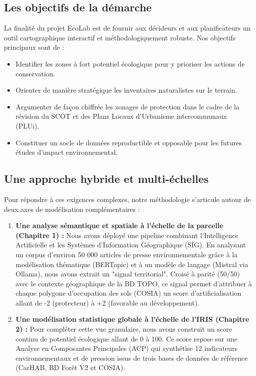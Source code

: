 \documentclass[11pt,a4paper]{report}
\begin{document}
\subsection*{Les objectifs de la démarche}

La finalité du projet EcoLab est de fournir aux décideurs et aux planificateurs un outil cartographique interactif et méthodologiquement robuste. Nos objectifs principaux sont de :

\begin{itemize}
    \item Identifier les zones à fort potentiel écologique pour y prioriser les actions de conservation.
    \item Orienter de manière stratégique les inventaires naturalistes sur le terrain.
    \item Argumenter de façon chiffrée les zonages de protection dans le cadre de la révision du SCOT et des Plans Locaux d'Urbanisme intercommunaux (PLUi).
    \item Constituer un socle de données reproductible et opposable pour les futures études d'impact environnemental.
\end{itemize}

\subsection*{Une approche hybride et multi-échelles}

Pour répondre à ces exigences complexes, notre méthodologie s'articule autour de deux axes de modélisation complémentaires :

\begin{enumerate}
    \item \textbf{Une analyse sémantique et spatiale à l'échelle de la parcelle (Chapitre 1) :} Nous avons déployé une pipeline combinant l'Intelligence Artificielle et les Systèmes d'Information Géographique (SIG). En analysant un corpus d'environ 50 000 articles de presse environnementale grâce à la modélisation thématique (BERTopic) et à un modèle de langage (Mistral via Ollama), nous avons extrait un "signal territorial". Croisé à parité (50/50) avec le contexte géographique de la BD TOPO, ce signal permet d'attribuer à chaque polygone d'occupation des sols (COSIA) un score d'artificialisation allant de -2 (protecteur) à +2 (favorable au développement).
    \item \textbf{Une modélisation statistique globale à l'échelle de l'IRIS (Chapitre 2) :} Pour compléter cette vue granulaire, nous avons construit un score continu de potentiel écologique allant de 0 à 100. Ce score repose sur une Analyse en Composantes Principales (ACP) qui synthétise 12 indicateurs environnementaux et de pression issus de trois bases de données de référence (CarHAB, BD Forêt V2 et COSIA).
\end{enumerate}
\end{document}
